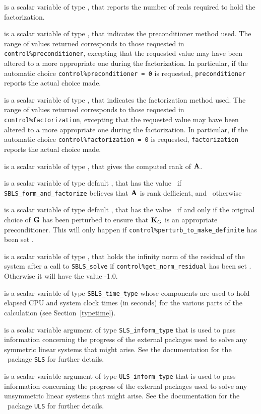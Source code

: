\documentclass{galahad}
\newcommand{\packagename}{SBLS}
\begin{document}
\begin{description}
 is a scalar variable of type \longinteger,
that reports the number of reals required to hold the factorization.

 is a scalar variable of type \integer,
that indicates the preconditioner method used. The range of values returned
corresponds to those requested in {\tt control\%preconditioner},
excepting that the requested value may have been altered to a more
appropriate one during the factorization. In particular, if the automatic
choice {\tt control\%preconditioner = 0} is requested,
{\tt preconditioner} reports the actual choice made.

 is a scalar variable of type \integer,
that indicates the factorization method used. The range of values returned
corresponds to those requested in {\tt control\%factorization},
excepting that the requested value may have been altered to a more
appropriate one during the factorization.
In particular, if the automatic
choice {\tt control\%factorization = 0} is requested,
{\tt factorization} reports the actual choice made.

 is a scalar variable of type \integer, that gives the
computed rank of ${\mathbf{A}}$.

 is a scalar variable of type default \logical, that has the
value \true\ if {\tt \packagename\_form\_and\_factorize} believes that
${\mathbf{A}}$ is rank defficient, and \false\ otherwise

 is a scalar variable of type default \logical, that has the
value \true\ if and only if the original choice of ${\mathbf{G}}$ has been perturbed to
ensure that ${\mathbf{K}}_G$ is an appropriate preconditioner. This will only
happen if {\tt control\-\%perturb\_to\_make\_definite} has been set \true.

 is a scalar variable of type \realdp,
that holds the infinity norm of the residual of the system 
after a call to {\tt \packagename\_solve} if {\tt control\%get\_norm\_residual}
has been set \true. Otherwise it will have the value -1.0.

 is a scalar variable of type {\tt \packagename\_time\_type}
whose components are used to hold elapsed CPU and system clock times
(in seconds) for the various parts of the calculation
(see Section~\ref{typetime}).

 is a scalar variable argument of type
{\tt SLS\_inform\_type} that is used to pass information
concerning the progress of the external packages used to solve any symmetric
linear systems that might arise.
See the documentation for the \galahad\ package {\tt SLS} for further details.

 is a scalar variable argument of type
{\tt ULS\_inform\_type} that is used to pass information
concerning the progress of the external packages used to solve any unsymmetric
linear systems that might arise.
See the documentation for the \galahad\ package {\tt ULS} for further details.
\end{description}
\end{document}
